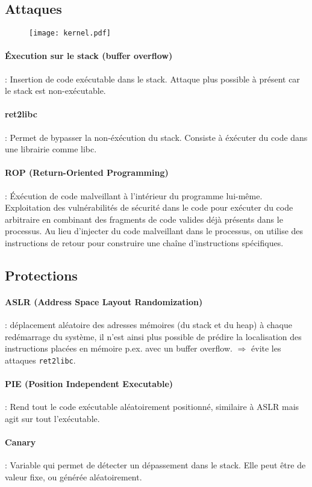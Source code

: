 \subsection{Attaques}
\begin{figure}[H]
    \centering
    \texttt{[image: kernel.pdf]}
\end{figure}
\paragraph{Éxecution sur le stack (buffer overflow)} : Insertion de code exécutable dans le stack. Attaque plus possible à présent car le stack est non-exécutable.
\paragraph{ret2libc} : Permet de bypasser la non-éxécution du stack. Consiste à éxécuter du code dans une librairie comme libc.
\paragraph{ROP (Return-Oriented Programming)} : Éxécution de code malveillant à l'intérieur du programme lui-même. Exploitation des vulnérabilités de sécurité dans le code pour exécuter du code arbitraire en combinant des fragments de code valides déjà présents dans le processus. Au lieu d'injecter du code malveillant dans le processus, on utilise des instructions de retour pour construire une chaîne d'instructions spécifiques.
\subsection{Protections}
\label{sec_protections}
\paragraph{ASLR (Address Space Layout Randomization)} : déplacement aléatoire des adresses mémoires (du stack et du heap) à chaque redémarrage du système, il n'est ainsi plus possible de prédire la localisation des instructions placées en mémoire p.ex. avec un buffer overflow. $\Rightarrow$ évite les attaques \verb+ret2libc+.
\paragraph{PIE (Position Independent Executable)} : Rend tout le code exécutable aléatoirement positionné, similaire à ASLR mais agit sur tout l'exécutable.
\paragraph{Canary} : Variable qui permet de détecter un dépassement dans le stack. Elle peut être de valeur fixe, ou générée aléatoirement.
